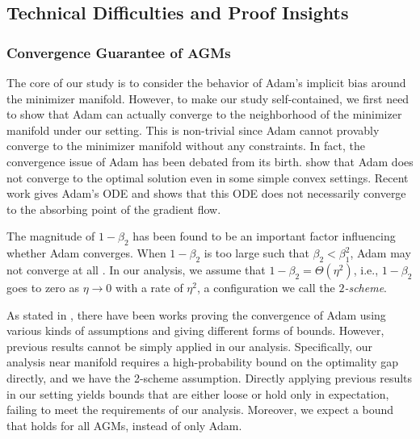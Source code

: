 \subsection{Technical Difficulties and Proof Insights}\label{subsec:difficulty}


\subsubsection{Convergence Guarantee of AGMs}

\label{subsubsec:convergence}
The core of our study is to consider the behavior of Adam's implicit bias around the minimizer manifold. However, to make our study self-contained, we first need to show that Adam can actually converge to the neighborhood of the minimizer manifold under our setting. This is non-trivial since Adam cannot provably converge to the minimizer manifold without any constraints. In fact, the convergence issue of Adam has been debated from its birth. \citet{reddi2018convergence} show that Adam does not converge to the optimal solution even in some simple convex settings. Recent work \citep{dereich2024convergence} gives Adam's ODE and shows that this ODE does not necessarily converge to the absorbing point of the gradient flow. 

The magnitude of $1-\beta_2$ has been found to be an important factor influencing whether Adam converges. When $1-\beta_2$ is too large such that $\beta_2 < \beta_1^2$, Adam may not converge at all \citep{reddi2018convergence,zhang2024convergence}. In our analysis, we assume that $1-\beta_2 = \Theta(\eta^2)$, i.e., $1-\beta_2$ goes to zero as $\eta\to 0$ with a rate of $\eta^2$, a configuration we call the \emph{$2$-scheme}. 

As stated in , there have been works proving the convergence of Adam using various kinds of assumptions and giving different forms of bounds. However, previous results cannot be simply applied in our analysis. Specifically, our analysis near manifold requires a high-probability bound on the optimality gap directly, and we have the 2-scheme assumption. Directly applying previous results in our setting yields bounds that are either loose or hold only in expectation, failing to meet the requirements of our analysis. Moreover, we expect a bound that holds for all AGMs, instead of only Adam.

